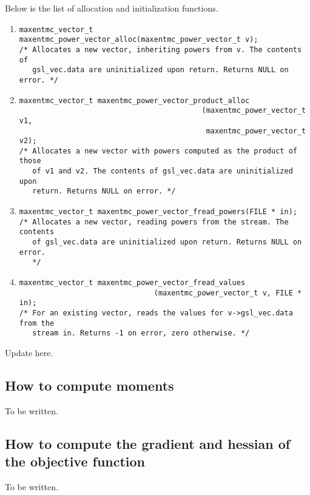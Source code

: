 \documentclass[12pt]{amsart}
\numberwithin{equation}{section}
\begin{document}
Below is the list of allocation and initialization functions.
\begin{enumerate}[1.]
\item \begin{verbatim}
maxentmc_vector_t maxentmc_power_vector_alloc(maxentmc_power_vector_t v);
/* Allocates a new vector, inheriting powers from v. The contents of
   gsl_vec.data are uninitialized upon return. Returns NULL on error. */
\end{verbatim}
\item \begin{verbatim}
maxentmc_vector_t maxentmc_power_vector_product_alloc
                                          (maxentmc_power_vector_t v1,
                                           maxentmc_power_vector_t v2);
/* Allocates a new vector with powers computed as the product of those
   of v1 and v2. The contents of gsl_vec.data are uninitialized upon
   return. Returns NULL on error. */
\end{verbatim}
\item \begin{verbatim}
maxentmc_vector_t maxentmc_power_vector_fread_powers(FILE * in);
/* Allocates a new vector, reading powers from the stream. The contents
   of gsl_vec.data are uninitialized upon return. Returns NULL on error.
   */
\end{verbatim}
\item \begin{verbatim}
maxentmc_vector_t maxentmc_power_vector_fread_values
                               (maxentmc_power_vector_t v, FILE * in);
/* For an existing vector, reads the values for v->gsl_vec.data from the
   stream in. Returns -1 on error, zero otherwise. */
\end{verbatim}
\end{enumerate}

Update here.

\subsection{How to compute moments}
\label{sec:quadrature}

To be written.

\subsection{How to compute the gradient and hessian of the objective function}
\label{sec:grad_hess}

To be written.
\end{document}
